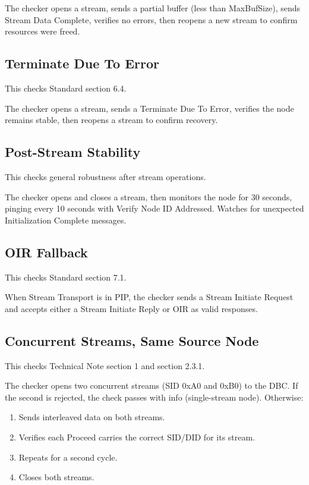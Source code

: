 The checker opens a stream, sends a partial buffer (less than MaxBufSize),
sends Stream Data Complete, verifies no errors, then reopens a new stream to
confirm resources were freed.

\subsection{Terminate Due To Error}

This checks Standard section 6.4.

The checker opens a stream, sends a Terminate Due To Error, verifies the node
remains stable, then reopens a stream to confirm recovery.

\subsection{Post-Stream Stability}

This checks general robustness after stream operations.

The checker opens and closes a stream, then monitors the node for 30 seconds,
pinging every 10 seconds with Verify Node ID Addressed.  Watches for
unexpected Initialization Complete messages.

\subsection{OIR Fallback}

This checks Standard section 7.1.

When Stream Transport is in PIP, the checker sends a Stream Initiate Request
and accepts either a Stream Initiate Reply or OIR as valid responses.

\subsection{Concurrent Streams, Same Source Node}

This checks Technical Note section 1 and section 2.3.1.

The checker opens two concurrent streams (SID 0xA0 and 0xB0) to the DBC.
If the second is rejected, the check passes with info (single-stream node).
Otherwise:
\begin{enumerate}
\item Sends interleaved data on both streams.
\item Verifies each Proceed carries the correct SID/DID for its stream.
\item Repeats for a second cycle.
\item Closes both streams.
\end{enumerate}

